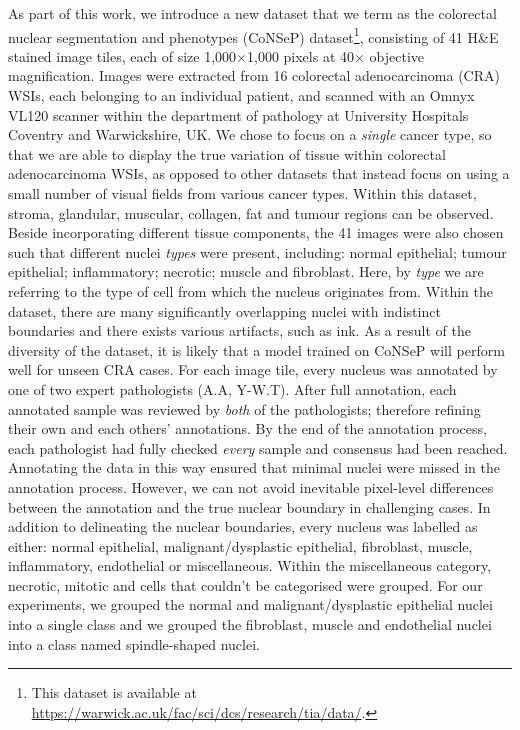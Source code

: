 \documentclass[journal]{IEEEtran}
\begin{document}
	As part of this work, we introduce a new dataset that we term as the colorectal nuclear segmentation and phenotypes (CoNSeP) dataset\footnote{This dataset is available at \url{https://warwick.ac.uk/fac/sci/dcs/research/tia/data/}.}, consisting of 41 H\&E stained image tiles, each of size 1,000$\times$1,000 pixels at 40$\times$ objective magnification. Images were extracted from 16 colorectal adenocarcinoma (CRA) WSIs, each belonging to an individual patient, and scanned with an Omnyx VL120 scanner within the department of pathology at University Hospitals Coventry and Warwickshire, UK. We chose to focus on a \textit{single} cancer type, so that we are able to display the true variation of tissue within colorectal adenocarcinoma WSIs, as opposed to other datasets that instead focus on using a small number of visual fields from various cancer types. Within this dataset, stroma, glandular, muscular, collagen, fat and tumour regions can be observed. Beside incorporating different tissue components, the 41 images were also chosen such that different nuclei \textit{types} were present, including: normal epithelial; tumour epithelial; inflammatory; necrotic; muscle and fibroblast. Here, by \textit{type} we are referring to the type of cell from which the nucleus originates from. Within the dataset, there are many significantly overlapping nuclei with indistinct boundaries and there exists various artifacts, such as ink. As a result of the diversity of the dataset, it is likely that a model trained on CoNSeP will perform well for unseen CRA cases. For each image tile, every nucleus was annotated by one of two expert pathologists (A.A, Y-W.T). After full annotation, each annotated sample was reviewed by \textit{both} of the pathologists; therefore refining their own and each others' annotations. By the end of the annotation process, each pathologist had fully checked \textit{every} sample and consensus had been reached. Annotating the data in this way ensured that minimal nuclei were missed in the annotation process. However, we can not avoid inevitable pixel-level differences between the annotation and the true nuclear boundary in challenging cases. In addition to delineating the nuclear boundaries, every nucleus was labelled as either: normal epithelial, malignant/dysplastic epithelial, fibroblast, muscle, inflammatory, endothelial or miscellaneous. Within the miscellaneous category, necrotic, mitotic and cells that couldn't be categorised were grouped. For our experiments, we grouped the normal and malignant/dysplastic epithelial nuclei into a single class and we grouped the fibroblast, muscle and endothelial nuclei into a class named spindle-shaped nuclei. 
	
\end{document}
